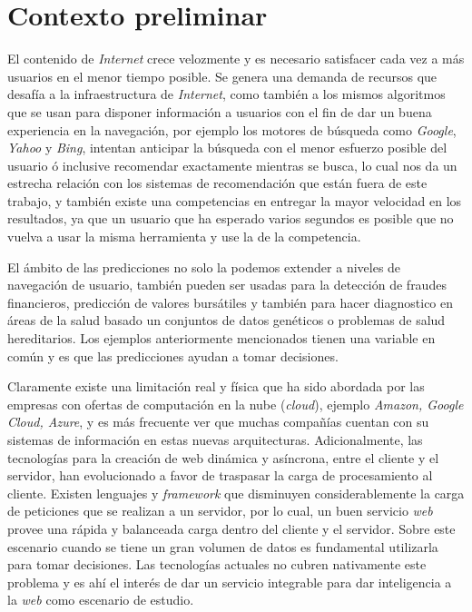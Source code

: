 \section{Contexto preliminar}\label{sec:preliminar}

	
	El contenido de \emph{Internet} crece velozmente y es necesario satisfacer cada vez a más usuarios en el menor tiempo posible. Se genera una demanda de recursos que desafía a la infraestructura de \emph{Internet}, como también a los mismos algoritmos que se usan para disponer información a usuarios con el fin de dar un buena experiencia en la navegación, por ejemplo los motores de búsqueda como \emph{Google}, \emph{Yahoo} y \emph{Bing}, intentan anticipar la búsqueda con el menor esfuerzo posible del usuario ó inclusive recomendar exactamente mientras se busca, lo cual nos da un estrecha relación con los sistemas de recomendación que están fuera de este trabajo, y también existe una competencias en entregar la mayor velocidad en los resultados, ya que un usuario que ha esperado varios segundos es posible que no vuelva a usar la misma herramienta y use la de la competencia.
	
	{El ámbito de las predicciones no solo la podemos extender a niveles de navegación de usuario, también pueden ser usadas para la detección de fraudes financieros, predicción de valores bursátiles y también para hacer diagnostico en áreas de la salud basado un conjuntos de datos genéticos o problemas de salud hereditarios. Los ejemplos anteriormente mencionados tienen una variable en común y es que las predicciones ayudan a tomar decisiones.}\label{ejemplos-casos-contextopreliminar}
	
	 Claramente existe una limitación real y física que ha sido abordada por las empresas con ofertas de computación en la nube (\emph{cloud}), ejemplo \emph{Amazon, Google Cloud, Azure}, y es más frecuente ver que muchas compañías cuentan con su sistemas de información en estas nuevas arquitecturas. Adicionalmente, las tecnologías para la creación de web dinámica y asíncrona, entre el cliente y el servidor, han evolucionado a favor de traspasar la carga de procesamiento al cliente. Existen lenguajes y \emph{framework} que disminuyen considerablemente la carga de peticiones que se realizan a un servidor, por lo cual, un buen servicio \emph{web} provee una rápida y balanceada carga dentro del cliente y el servidor. Sobre este escenario cuando se tiene un gran volumen de datos es fundamental utilizarla para tomar decisiones. Las tecnologías actuales no cubren nativamente este problema y es ahí el interés de dar un servicio integrable para dar inteligencia a la \emph{web} como escenario de estudio.

